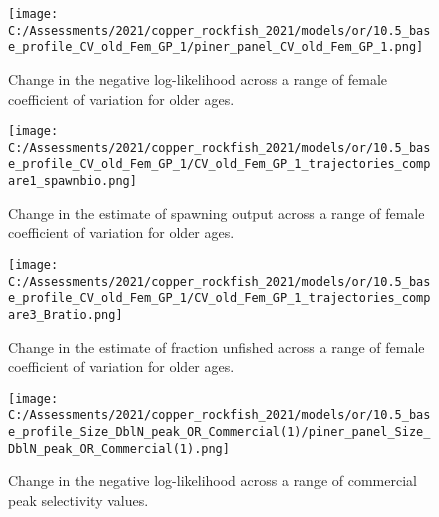 \documentclass[11pt,
  english,
  a4paper,
]{article}
\begin{document}
\tagmcend\tagstructend


\begin{figure}
\centering
\texttt{[image: C:/Assessments/2021/copper\_rockfish\_2021/models/or/10.5\_base\_profile\_CV\_old\_Fem\_GP\_1/piner\_panel\_CV\_old\_Fem\_GP\_1.png]}
\caption{Change in the negative log-likelihood across a range of female coefficient of variation for older ages.\label{fig:cv-profile}}
\end{figure}

\tagmcend\tagstructend


\begin{figure}
\centering
\texttt{[image: C:/Assessments/2021/copper\_rockfish\_2021/models/or/10.5\_base\_profile\_CV\_old\_Fem\_GP\_1/CV\_old\_Fem\_GP\_1\_trajectories\_compare1\_spawnbio.png]}
\caption{Change in the estimate of spawning output across a range of female coefficient of variation for older ages.\label{fig:cv-ssb}}
\end{figure}

\tagmcend\tagstructend


\begin{figure}
\centering
\texttt{[image: C:/Assessments/2021/copper\_rockfish\_2021/models/or/10.5\_base\_profile\_CV\_old\_Fem\_GP\_1/CV\_old\_Fem\_GP\_1\_trajectories\_compare3\_Bratio.png]}
\caption{Change in the estimate of fraction unfished across a range of female coefficient of variation for older ages.\label{fig:cv-depl}}
\end{figure}

\tagmcend\tagstructend


\begin{figure}
\centering
\texttt{[image: C:/Assessments/2021/copper\_rockfish\_2021/models/or/10.5\_base\_profile\_Size\_DblN\_peak\_OR\_Commercial(1)/piner\_panel\_Size\_DblN\_peak\_OR\_Commercial(1).png]}
\caption{Change in the negative log-likelihood across a range of commercial peak selectivity values.\label{fig:selex-profile}}
\end{figure}
\end{document}
